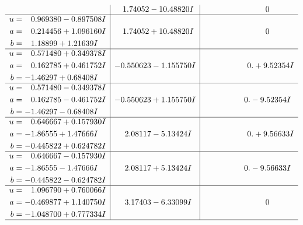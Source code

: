 \documentclass[1p]{elsarticle_modified}
\theoremstyle{definition}
\begin{document}
$$\begin{array}{c|c|c}
 & \phantom{-}1.74052 - 10.48820 I & \phantom{-0.000000 } 0 \\ \hline\begin{aligned}
u &= \phantom{-}0.969380 - 0.897508 I \\
a &= \phantom{-}0.214456 + 1.096160 I \\
b &= \phantom{-}1.18899 + 1.21639 I\end{aligned}
 & \phantom{-}1.74052 + 10.48820 I & \phantom{-0.000000 } 0 \\ \hline\begin{aligned}
u &= \phantom{-}0.571480 + 0.349378 I \\
a &= \phantom{-}0.162785 + 0.461752 I \\
b &= -1.46297 + 0.68408 I\end{aligned}
 & -0.550623 - 1.155750 I & \phantom{-0.000000 -}0. + 9.52354 I \\ \hline\begin{aligned}
u &= \phantom{-}0.571480 - 0.349378 I \\
a &= \phantom{-}0.162785 - 0.461752 I \\
b &= -1.46297 - 0.68408 I\end{aligned}
 & -0.550623 + 1.155750 I & \phantom{-0.000000 } 0. - 9.52354 I \\ \hline\begin{aligned}
u &= \phantom{-}0.646667 + 0.157930 I \\
a &= -1.86555 + 1.47666 I \\
b &= -0.445822 + 0.624782 I\end{aligned}
 & \phantom{-}2.08117 - 5.13424 I & \phantom{-0.000000 -}0. + 9.56633 I \\ \hline\begin{aligned}
u &= \phantom{-}0.646667 - 0.157930 I \\
a &= -1.86555 - 1.47666 I \\
b &= -0.445822 - 0.624782 I\end{aligned}
 & \phantom{-}2.08117 + 5.13424 I & \phantom{-0.000000 } 0. - 9.56633 I \\ \hline\begin{aligned}
u &= \phantom{-}1.096790 + 0.760066 I \\
a &= -0.469877 + 1.140750 I \\
b &= -1.048700 + 0.777334 I\end{aligned}
 & \phantom{-}3.17403 - 6.33099 I & \phantom{-0.000000 } 0\\
 \hline 
 \end{array}$$\newpage$$\begin{array}{c|c|c}  

\end{array}$$
\end{document}
